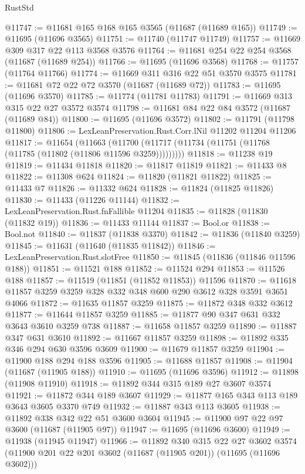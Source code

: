 \begin{lexlean}{RustStd}
\begin{coremodule}
@11747 := @11681 @165 @168 @165 @3565 (@11687 (@11689 @165))
@11749 := @11695 (@11696 @3565)
@11751 := @11740 (@11747 @11749)
@11757 := @11669 @309 @317 @22 @113 @3568 @3576
@11764 := @11681 @254 @22 @254 @3568 (@11687 (@11689 @254))
@11766 := @11695 (@11696 @3568)
@11768 := @11757 (@11764 @11766)
@11774 := @11669 @311 @316 @22 @51 @3570 @3575
@11781 := @11681 @72 @22 @72 @3570 (@11687 (@11689 @72))
@11783 := @11695 (@11696 @3570)
@11785 := @11774 (@11781 @11783)
@11791 := @11669 @313 @315 @22 @27 @3572 @3574
@11798 := @11681 @84 @22 @84 @3572 (@11687 (@11689 @84))
@11800 := @11695 (@11696 @3572)
@11802 := @11791 (@11798 @11800)
@11806 := LexLeanPreservation.Rust.Corr.lNil @11202 @11204 @11206
@11817 := @11654
    (@11663 (@11700 (@11717 (@11734 (@11751 (@11768 (@11785 (@11802 (@11806 @11596 @3259)))))))))
@11818 := @11238 @19
@11819 := @11434 @11818
@11820 := @11817 @11819
@11821 := @11433 @8
@11822 := @11308 @624
@11824 := @11820 (@11821 @11822)
@11825 := @11433 @7
@11826 := @11332 @624
@11828 := @11824 (@11825 @11826)
@11830 := @11433 (@11226 @11144)
@11832 := LexLeanPreservation.Rust.fnFallible @11204
@11835 := @11828 (@11830 (@11832 @19))
@11836 := @11433 @11144
@11837 := Bool.or
@11838 := Bool.not
@11840 := @11837 (@11838 @3370)
@11842 := @11836 (@11840 @3259)
@11845 := @11631 (@11640 (@11835 @11842))
@11846 := LexLeanPreservation.Rust.slotFree
@11850 := @11845 (@11836 (@11846 @11596 @188))
@11851 := @11521 @188
@11852 := @11524 @294
@11853 := @11526 @188
@11857 := @11519 (@11851 (@11852 @11853)) @11596
@11870 := @11618 @11857 @3259 @3259 @328 @332 @348 @600 @290 @3612 @328 @3591 @3651 @4066
@11872 := @11635 @11857 @3259
@11875 := @11872 @348 @332 @3612
@11877 := @11644 @11857 @3259
@11885 := @11877 @90 @347 @631 @332 @3643 @3610 @3259 @738
@11887 := @11658 @11857 @3259
@11890 := @11887 @347 @631 @3610
@11892 := @11667 @11857 @3259
@11898 := @11892 @335 @346 @294 @630 @3596 @3609
@11900 := @11679 @11857 @3259
@11904 := @11900 @188 @294 @188 @3596
@11905 := @11688 @11857
@11908 := @11904 (@11687 (@11905 @188))
@11910 := @11695 (@11696 @3596)
@11912 := @11898 (@11908 @11910)
@11918 := @11892 @344 @315 @189 @27 @3607 @3574
@11921 := @11872 @344 @189 @3607
@11929 := @11877 @165 @343 @113 @189 @3643 @3605 @3370 @749
@11932 := @11887 @343 @113 @3605
@11938 := @11892 @338 @342 @22 @51 @3600 @3604
@11945 := @11900 @97 @22 @97 @3600 (@11687 (@11905 @97))
@11947 := @11695 (@11696 @3600)
@11949 := @11938 (@11945 @11947)
@11966 := @11892
    @340
    @315
    @22
    @27
    @3602
    @3574
    (@11900 @201 @22 @201 @3602 (@11687 (@11905 @201)) (@11695 (@11696 @3602)))

\end{coremodule}
\end{lexlean}

